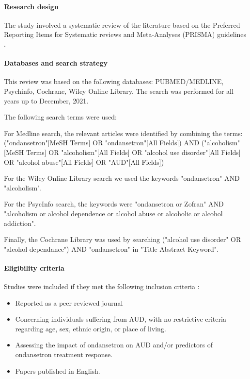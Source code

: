 \paragraph{Research design}
The study involved a systematic review of the literature based on the Preferred Reporting Items for Systematic reviews and Meta-Analyses (PRISMA) guidelines \cite{page2021prisma}.

\paragraph{Databases and search strategy}
This review was based on the following databases: PUBMED/MEDLINE, Psychinfo, Cochrane, Wiley Online Library. The search was performed for all years up to December, 2021. 

The following search terms were used:

For Medline search, the relevant articles were identified by combining the terms: ("ondansetron"[MeSH Terms] OR "ondansetron"[All Fields]) AND ("alcoholism"[MeSH Terms] OR "alcoholism"[All Fields] OR "alcohol use disorder"[All Fields] OR "alcohol abuse"[All Fields] OR "AUD"[All Fields])

For the Wiley Online Library search we used the keywords "ondansetron" AND "alcoholism".

For the PsycInfo search, the keywords were "ondansetron or Zofran" AND "alcoholism or alcohol dependence or alcohol abuse or alcoholic or alcohol addiction".

Finally, the Cochrane Library was used by searching ("alcohol use disorder" OR "alcohol dependance") AND "ondansetron" in "Title Abstract Keyword".

\paragraph{Eligibility criteria}
Studies were included if they met the following inclusion criteria :
\begin{itemize}
 \item Reported as a peer reviewed journal
    \item Concerning individuals suffering from AUD, with no restrictive criteria regarding age, sex, ethnic origin, or place of living.
    \item Assessing the impact of ondansetron on AUD and/or predictors of ondansetron treatment response.
    \item Papers published in English.
\end{itemize}

